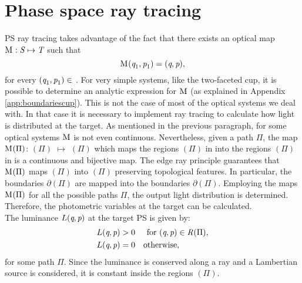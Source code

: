 \section{Phase space ray tracing}\label{sec:PS_raytracing}
PS ray tracing takes advantage of the fact that there exists an optical map
$
\mathrm{M}_{\textit{}}: \mbox{$\emph{S}_{\textit{}}$} \mapsto \mbox{$\emph{T}_{\textit{}}$}
$
 such that
\begin{equation}
\mathrm{M}_{\textit{}}(\textit{q}_1,\textit{p}_1)=(\textit{q},\textit{p}),
\end{equation} for every $(\textit{q}_1,\textit{p}_1)\in$ .
For very simple systems, like the two-faceted cup, it is possible to determine an analytic expression for $\mathrm{M}_{\textit{}}$ (as explained in Appendix \ref{app:boundariescup}).
This is not the case of most of the optical systems we deal with. In that case it is necessary to implement ray tracing to calculate how light is distributed at the target.
As mentioned in the previous paragraph, for some optical systems $\mathrm{M}_{\textit{}}$ is not even continuous.
Nevertheless, given a path $\Pi$, the map $\mathrm{M}_{\textit{}}(\Pi)$: $(\Pi)$ $\mapsto$ $(\Pi)$
which maps the regions $(\Pi)$ in  into the regions $(\Pi)$ in  is a continuous and bijective map.
  The edge ray principle guarantees that $\mathrm{M}_{\textit{}}(\Pi)$ maps $(\Pi)$ into $(\Pi)$ preserving topological features. In particular, the boundaries $\partial$$(\Pi)$ are mapped into the boundaries $\partial$$(\Pi)$. %
Employing the maps $\mathrm{M}_{\textit{}}(\Pi)$ for all the possible paths $\Pi$, the output light distribution is determined. Therefore, the photometric variables at the target can be calculated.
\\ \indent The luminance $L(\textit{q}, \textit{p})$ at the target PS is given by:
\begin{equation}
\begin{aligned}
\label{eq:PSluminance}
L(\variabile{q}, \variabile{p}) &> 0 & \mbox{for } (\variabile{q}, \variabile{p})\in \mbox{\set{R}{}{}}(\Pi),\\ \vspace{0.5 cm}
L(\variabile{q}, \variabile{p}) &= 0 & \mbox{otherwise},\qquad \quad \;\;
\end{aligned}
\end{equation}
for some path $\Pi$. Since the luminance is conserved along a ray and a Lambertian source is considered, it is constant inside the regions $(\Pi)$.
